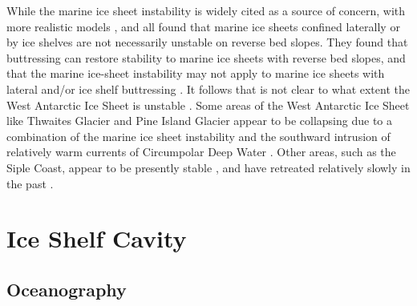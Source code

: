 While the marine ice sheet instability is widely cited as a source of concern, with more realistic models \cite{haseloff2018effect}, \cite{gudmundsson2013ice} and \cite{jamieson2012ice} all found that marine ice sheets confined laterally or by ice shelves are not necessarily unstable on reverse bed slopes. They found that buttressing can restore stability to marine ice sheets with reverse bed slopes, and that the marine ice-sheet instability may not apply to marine ice sheets with lateral and/or ice shelf buttressing \citep{haseloff2018effect}. It follows that is not clear to what extent the West Antarctic Ice Sheet is  unstable \citep{vaughan2008west}. Some areas of the West Antarctic Ice Sheet like Thwaites Glacier and Pine Island Glacier appear to be collapsing due to a combination of the marine ice sheet instability and the southward intrusion of relatively warm currents of Circumpolar Deep Water \citep{ favier2014retreat, joughin2014marine}. Other areas, such as the Siple Coast, appear to be presently stable \citep{hindmarsh1996stability}, and have retreated relatively slowly in the past \citep{conway1999past}.




\section{Ice Shelf Cavity} \label{ice_shelves}

\subsection{Oceanography} \label{oceanography}


